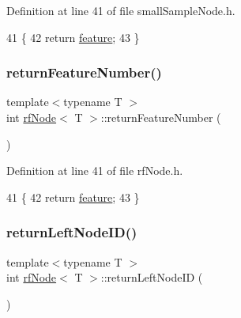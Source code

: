 Definition at line 41 of file small\+Sample\+Node.\+h.


\begin{DoxyCode}
41                                         \{
42             \textcolor{keywordflow}{return} \hyperlink{classrfNode_ac8c0dd14a4e53f9b831f326f5d197e0e}{feature};
43         \}
\end{DoxyCode}
\mbox{\label{classrfNode_a060b06548e267392449252e14e9edab1}} 
\subsubsection{\texorpdfstring{return\+Feature\+Number()}{returnFeatureNumber()}\hspace{0.1cm}{\footnotesize\ttfamily [2/2]}}
{\footnotesize\ttfamily template$<$typename T $>$ \\
int \hyperlink{classrfNode}{rf\+Node}$<$ T $>$\+::return\+Feature\+Number (\begin{DoxyParamCaption}{ }\end{DoxyParamCaption})\hspace{0.3cm}{\ttfamily [inline]}}



Definition at line 41 of file rf\+Node.\+h.


\begin{DoxyCode}
41                                         \{
42             \textcolor{keywordflow}{return} \hyperlink{classrfNode_ac8c0dd14a4e53f9b831f326f5d197e0e}{feature};
43         \}
\end{DoxyCode}
\mbox{\label{classrfNode_a97148e8fd84a37471ab7ad5e7bdc12a4}} 
\subsubsection{\texorpdfstring{return\+Left\+Node\+I\+D()}{returnLeftNodeID()}\hspace{0.1cm}{\footnotesize\ttfamily [1/2]}}
{\footnotesize\ttfamily template$<$typename T $>$ \\
int \hyperlink{classrfNode}{rf\+Node}$<$ T $>$\+::return\+Left\+Node\+ID (\begin{DoxyParamCaption}{ }\end{DoxyParamCaption})\hspace{0.3cm}{\ttfamily [inline]}}



